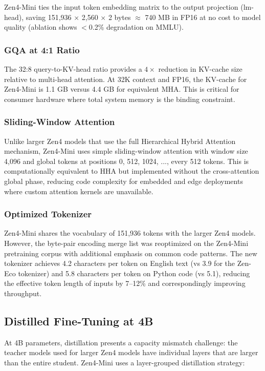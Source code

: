 \documentclass[11pt,a4paper]{article}
\begin{document}
Zen4-Mini ties the input token embedding matrix to the output projection (lm-head),
saving 151,936 $\times$ 2,560 $\times$ 2 bytes $\approx$ 740 MB in FP16 at no cost
to model quality (ablation shows $<$0.2\% degradation on MMLU).

\subsubsection{GQA at 4:1 Ratio}

The 32:8 query-to-KV-head ratio provides a $4\times$ reduction in KV-cache size relative
to multi-head attention. At 32K context and FP16, the KV-cache for Zen4-Mini is 1.1 GB
versus 4.4 GB for equivalent MHA. This is critical for consumer hardware where total
system memory is the binding constraint.

\subsubsection{Sliding-Window Attention}

Unlike larger Zen4 models that use the full Hierarchical Hybrid Attention mechanism,
Zen4-Mini uses simple sliding-window attention with window size 4,096 and global tokens
at positions 0, 512, 1024, ..., every 512 tokens. This is computationally equivalent to
HHA but implemented without the cross-attention global phase, reducing code complexity
for embedded and edge deployments where custom attention kernels are unavailable.

\subsubsection{Optimized Tokenizer}

Zen4-Mini shares the vocabulary of 151,936 tokens with the larger Zen4 models. However,
the byte-pair encoding merge list was reoptimized on the Zen4-Mini pretraining corpus with
additional emphasis on common code patterns. The new tokenizer achieves 4.2 characters
per token on English text (vs 3.9 for the Zen-Eco tokenizer) and 5.8 characters per token
on Python code (vs 5.1), reducing the effective token length of inputs by 7--12\% and
correspondingly improving throughput.

\subsection{Distilled Fine-Tuning at 4B}

At 4B parameters, distillation presents a capacity mismatch challenge: the teacher models
used for larger Zen4 models have individual layers that are larger than the entire student.
Zen4-Mini uses a layer-grouped distillation strategy:
\end{document}
